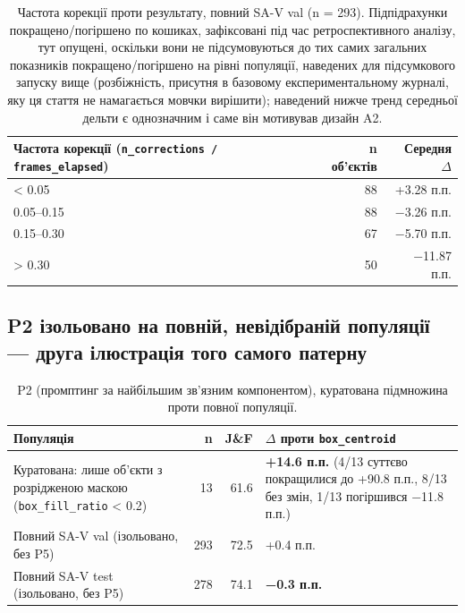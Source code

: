 \documentclass[11pt]{article}
\begin{document}
\begin{table}[!htbp]
\centering
\caption{Частота корекції проти результату, повний SA-V val (n = 293). Підпідрахунки покращено/погіршено по кошиках, зафіксовані під час ретроспективного аналізу, тут опущені, оскільки вони не підсумовуються до тих самих загальних показників покращено/погіршено на рівні популяції, наведених для підсумкового запуску вище (розбіжність, присутня в базовому експериментальному журналі, яку ця стаття не намагається мовчки вирішити); наведений нижче тренд середньої дельти є однозначним і саме він мотивував дизайн A2.}
\label{tab:6}
\small
\begin{tabularx}{\textwidth}{@{}Lrr@{}}
\toprule
Частота корекції (\texttt{n\_corrections / frames\_elapsed}) & n об'єктів & Середня $\Delta$ \\
\midrule
< 0.05 & 88 & +3.28 п.п. \\
0.05--0.15 & 88 & −3.26 п.п. \\
0.15--0.30 & 67 & −5.70 п.п. \\
> 0.30 & 50 & −11.87 п.п. \\
\bottomrule
\end{tabularx}
\end{table}

\subsection{P2 ізольовано на повній, невідібраній популяції --- друга ілюстрація того самого патерну}

\begin{table}[!htbp]
\centering
\caption{P2 (промптинг за найбільшим зв'язним компонентом), куратована підмножина проти повної популяції.}
\label{tab:7}
\small
\begin{tabularx}{\textwidth}{@{}LrrL@{}}
\toprule
Популяція & n & J\&F & $\Delta$ проти \texttt{box\_centroid} \\
\midrule
Куратована: лише об'єкти з розрідженою маскою (\texttt{box\_fill\_ratio} < 0.2) & 13 & 61.6 & \textbf{+14.6 п.п.} (4/13 суттєво покращилися до +90.8 п.п., 8/13 без змін, 1/13 погіршився −11.8 п.п.) \\
Повний SA-V val (ізольовано, без P5) & 293 & 72.5 & +0.4 п.п. \\
Повний SA-V test (ізольовано, без P5) & 278 & 74.1 & \textbf{−0.3 п.п.} \\
\bottomrule
\end{tabularx}
\end{table}
\end{document}
